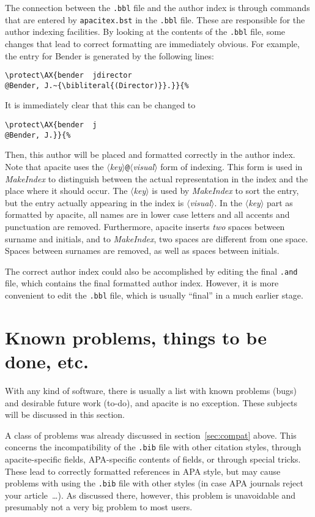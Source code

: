 \documentclass{article}
\newcommand{\bibliteral}[1]{#1}
\newcommand{\MakeIndex}{\textit{MakeIndex}}
\newcommand{\pkg}[1]{\textsf{#1}}%
\newcommand{\fname}[1]{\texttt{#1}}%
\newcommand{\cmd}[1]{\texttt{\string#1}}%
\newcommand{\opt}[1]{$\langle${\itshape #1}$\rangle$}%
\begin{document}
The connection between the \fname{.bbl} file and the author index is through
\cmd{\AX} commands that are entered by \fname{apacitex.bst} in the
\fname{.bbl} file. These are responsible for the author indexing facilities.
By looking at the contents of the \fname{.bbl} file, some changes that lead to
correct formatting are immediately obvious. For example, the entry for Bender
is generated by the following lines:
\begin{verbatim}
\protect\AX{bender  jdirector
@Bender, J.~{\bibliteral{(Director)}}.}}{%
\end{verbatim}
It is immediately clear that this can be changed to
\begin{verbatim}
\protect\AX{bender  j
@Bender, J.}}{%
\end{verbatim}
Then, this author will be placed and formatted correctly in the author index.
Note that \pkg{apacite} uses the \opt{key}\verb+@+\opt{visual} form of
indexing. This form is used in \MakeIndex{} to distinguish between the actual
representation in the index and the place where it should occur. The \opt{key}
is used by \MakeIndex{} to sort the entry, but the entry actually appearing in
the index is \opt{visual}. In the \opt{key} part as formatted by
\pkg{apacite}, all names are in lower case letters and all accents and
punctuation are removed. Furthermore, \pkg{apacite} inserts \emph{two} spaces
between surname and initials, and to \MakeIndex{}, two spaces are different
from one space. Spaces between surnames are removed, as well as spaces between
initials.

The correct author index could also be accomplished by editing the final
\fname{.and} file, which contains the final formatted author index. However,
it is more convenient to edit the \fname{.bbl} file, which is usually
``final'' in a much earlier stage.

\section{Known problems, things to be done, etc.}
\label{sec:todo}
With any kind of software, there is usually a list with known problems (bugs)
and desirable future work (to-do), and \pkg{apacite} is no exception. These
subjects will be discussed in this section.

A class of problems was already discussed in section~\ref{sec:compat} above.
This concerns the incompatibility of the \fname{.bib} file with other citation
styles, through \pkg{apacite}-specific fields, APA-specific contents of
fields, or through special tricks. These lead to correctly formatted
references in APA style, but may cause problems with using the \fname{.bib}
file with other styles (in case APA journals reject your article~\ldots). As
discussed there, however, this problem is unavoidable and presumably not a
very big problem to most users.
\end{document}
